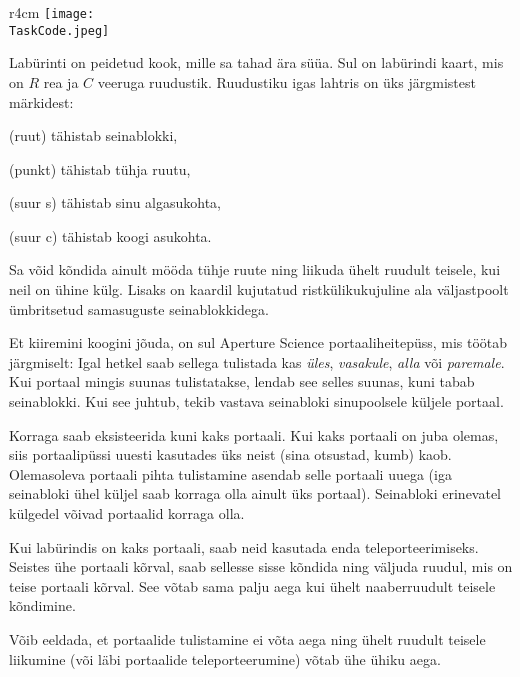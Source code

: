 \documentclass{boi2014-et}
\renewcommand{\TaskCode}{portals}
\newcommand{\constant}[1]{{\tt #1}}
\begin{document}
    \begin{wrapfigure}[4]{r}{4cm}
        \vspace{-24pt}
        \texttt{[image: \\TaskCode.jpeg]}
    \end{wrapfigure}

    Labürinti on peidetud kook, mille sa tahad ära süüa.
    Sul on labürindi kaart, mis on $R$ rea ja $C$ veeruga ruudustik.
    Ruudustiku igas lahtris on üks järgmistest märkidest:
    \begin{description}[itemindent=1pt]
        \item[\constant{\#}] (ruut) tähistab seinablokki,
        \item[\constant{.}] (punkt) tähistab tühja ruutu,
        \item[\constant{S}] (suur s) tähistab sinu algasukohta,
        \item[\constant{C}] (suur c) tähistab koogi asukohta.
    \end{description}

    Sa võid kõndida ainult mööda tühje ruute ning liikuda ühelt ruudult teisele,
    kui neil on ühine külg. Lisaks on kaardil kujutatud ristkülikukujuline ala
    väljastpoolt ümbritsetud samasuguste seinablokkidega.

    Et kiiremini koogini jõuda, on sul Aperture Science\texttrademark{}
    portaaliheitepüss, mis töötab järgmiselt:
    Igal hetkel saab sellega tulistada kas
    \emph{üles}, \emph{vasakule}, \emph{alla} või \emph{paremale}.
    Kui portaal mingis suunas tulistatakse, lendab see selles suunas, kuni tabab seinablokki.
    Kui see juhtub, tekib vastava seinabloki sinupoolsele küljele portaal.

    Korraga saab eksisteerida kuni kaks portaali. Kui kaks portaali on juba olemas,
    siis portaalipüssi uuesti kasutades üks neist (sina otsustad, kumb) kaob.
    Olemasoleva portaali pihta tulistamine asendab selle portaali uuega
    (iga seinabloki ühel küljel saab korraga olla ainult üks portaal).
    Seinabloki erinevatel külgedel võivad portaalid korraga olla.

    Kui labürindis on kaks portaali, saab neid kasutada enda teleporteerimiseks.
    Seistes ühe portaali kõrval, saab sellesse sisse kõndida ning väljuda ruudul,
    mis on teise portaali kõrval. See võtab sama palju aega kui ühelt naaberruudult teisele kõndimine.

    Võib eeldada, et portaalide tulistamine ei võta aega ning ühelt ruudult teisele liikumine
    (või läbi portaalide teleporteerumine) võtab ühe ühiku aega.
\end{document}
